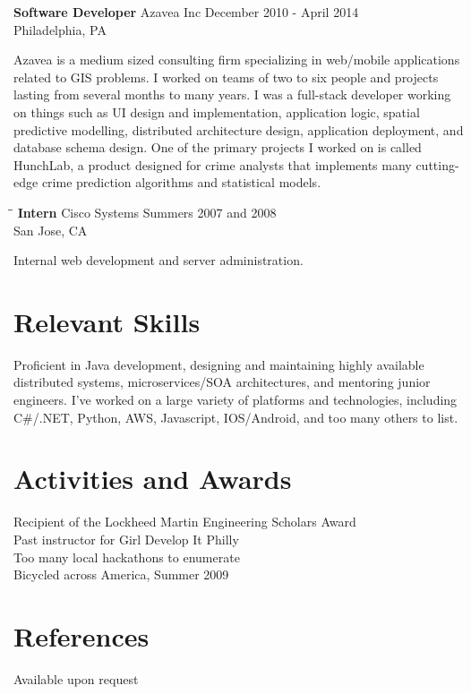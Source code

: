 \documentclass{res}
\begin{document}
\begin{resume}
\begin{tabbing}
    {\bf Software Developer} \>Azavea Inc     \>December 2010 - April 2014\\
                             \>Philadelphia, PA
   \end{tabbing}\vspace{-17pt}      %
   Azavea is a medium sized consulting firm specializing in web/mobile
   applications related to GIS problems.  I worked
   on teams of two to six people and projects lasting from
   several months to many years.  I was a full-stack developer working on
   things such as UI design and implementation, application logic, spatial
   predictive modelling, distributed architecture design, application
   deployment, and database schema design.  One of the primary projects I
   worked on is called HunchLab, a product designed for crime analysts that
   implements many cutting-edge crime prediction algorithms and statistical
   models.
   \begin{tabbing}%
   \hspace{2.2in}\= \hspace{2.2in}\= \kill %
   {\bf Intern}  \> Cisco Systems\> Summers 2007 and 2008\\
                          \> San Jose, CA
   \end{tabbing}\vspace{-17pt}
   Internal web development and server administration.


\section{Relevant Skills}
Proficient in Java development, designing and maintaining highly available distributed systems, microservices/SOA architectures, and mentoring junior engineers.  I've worked on a large variety of platforms and technologies, including C#/.NET, Python, AWS, Javascript, IOS/Android, and too many others to list.
 
\section{Activities and Awards}          
    Recipient of the Lockheed Martin Engineering Scholars Award\\
    Past instructor for Girl Develop It Philly\\
    Too many local hackathons to enumerate\\
    Bicycled across America, Summer 2009

\section{References}
    Available upon request
 
\end{resume}
\end{document}

